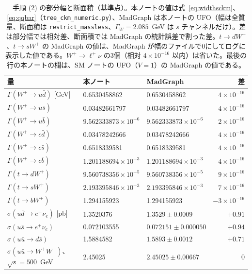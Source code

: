 \documentclass[a4paper,10pt]{ltjsarticle}
\begin{document}
\begin{table}[tbp]
\centering\small
\caption{手順 (2) の部分幅と断面積（基準点）。本ノートの値は式~\eqref{eq:widthsckm}、\eqref{eq:qqbar}（\texttt{tree\_ckm\_numeric.py}）、MadGraph は本ノートの UFO（幅は全質量、断面積は \texttt{restrict\_massless}、$\Gamma_W=2.085$~GeV は $s$ チャンネルだけ）。差は部分幅では相対差、断面積では MadGraph の統計誤差で割った差。$t\to dW^+$、$t\to sW^+$ の MadGraph の値は、MadGraph が幅のファイルで0にしてログに表示した値である。$W^+\to\ell^+\nu$ の3個（相対 $4\times10^{-16}$ 以内）は省いた。最後の行の本ノートの欄は、SM ノートの UFO（$V=1$）の MadGraph の値である。}
\label{tab:tree}
\begin{tabular}{lllr}
\toprule
量 & 本ノート & MadGraph & 差 \\
\midrule
$\Gamma(W^+\to u\bar d)$ [GeV] & 0.6530458862 & 0.6530458862 & $4\times10^{-16}$ \\
$\Gamma(W^+\to u\bar s)$ & 0.03482661797 & 0.03482661797 & $4\times10^{-16}$ \\
$\Gamma(W^+\to u\bar b)$ & $9.562333873\times10^{-6}$ & $9.562333873\times10^{-6}$ & $2\times10^{-16}$ \\
$\Gamma(W^+\to c\bar d)$ & 0.03478242666 & 0.03478242666 & $4\times10^{-16}$ \\
$\Gamma(W^+\to c\bar s)$ & 0.6518339581 & 0.6518339581 & $4\times10^{-16}$ \\
$\Gamma(W^+\to c\bar b)$ & $1.201188694\times10^{-3}$ & $1.201188694\times10^{-3}$ & $4\times10^{-16}$ \\
$\Gamma(t\to dW^+)$ & $9.560738356\times10^{-5}$ & $9.560738356\times10^{-5}$ & $9\times10^{-16}$ \\
$\Gamma(t\to sW^+)$ & $2.193395846\times10^{-3}$ & $2.193395846\times10^{-3}$ & $7\times10^{-16}$ \\
$\Gamma(t\to bW^+)$ & 1.294155923 & 1.294155923 & $-3\times10^{-16}$ \\
\midrule
$\sigma(u\bar d\to e^+\nu_e)$ [pb] & 1.3520376 & $1.3529\pm0.0009$ & $+0.91$ \\
$\sigma(u\bar s\to e^+\nu_e)$ & 0.072103555 & $0.072151\pm0.000050$ & $+0.94$ \\
$\sigma(u\bar u\to d\bar s)$ & 1.5884582 & $1.5893\pm0.0012$ & $+0.71$ \\
$\sigma(u\bar u\to W^+W^-)$、$\sqrt s=500$~GeV & 2.45025 & $2.45025\pm0.00667$ & 0 \\
\bottomrule
\end{tabular}
\end{table}
\end{document}
